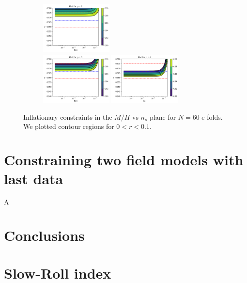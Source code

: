 \documentclass[twocolumn,           %
               showpacs,            %
               preprintnumbers,     %
               aps,                 %
               prl,          	    %
               letterpaper,             %
               superscriptaddress,      %
               nofootinbib,         %
               tightenlines,        %
               floats,floatfix      %
               ,usenatbib,
               ]{revtex4-1}
\begin{document}
\begin{figure}[h]
\begin{subfigure}[b]{\textwidth}
\includegraphics[width=0.4\textwidth]{p260.png}\\ \includegraphics[width=0.4\textwidth]{p360.png}
\includegraphics[width=0.4\textwidth]{p460.png}
\label{curv60}
\end{subfigure}
\caption{Inflationary constraints in the $M/H$ vs $n_s$ plane for $N=60$ e-folds. We plotted contour regions for $0<r<0.1$.}
\end{figure}
\section{Constraining two field models with last data}
A
\section{Conclusions}
\appendix
\section{Slow-Roll index}
\end{document}
